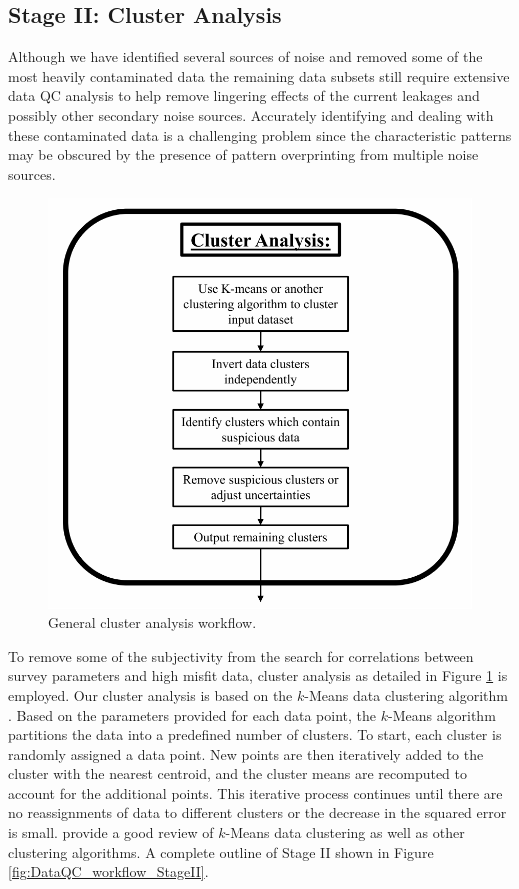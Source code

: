 \documentclass[final,authoryear,5p,times,twocolumn]{elsarticle}
\begin{document}
\subsection{Stage II: Cluster Analysis}
\label{Data_Quality_Control:StageII_Cluster_Analysis}

Although we have identified several sources of noise and removed some of the most heavily contaminated data the remaining data subsets still require extensive data QC analysis to help remove lingering effects of the current leakages and possibly other secondary noise sources. Accurately identifying and dealing with these contaminated data is a challenging problem since the characteristic patterns may be obscured by the presence of pattern overprinting from multiple noise sources. 

\begin{figure} [!ht]
\begin{center}
   \includegraphics[trim=0cm 0cm 0cm 0cm, clip=true,width=0.75\linewidth]{./Figures/Fig10.pdf}    
\end{center}
\caption{General cluster analysis workflow.}
\label{fig:DataQC_workflow_ClusterAnalysis}
\end{figure}

To remove some of the subjectivity from the search for correlations between survey parameters and high misfit data, cluster analysis as detailed in Figure \ref{fig:DataQC_workflow_ClusterAnalysis} is employed. Our cluster analysis is based on the $k$-Means data clustering algorithm \citep{MacQueen1967}. Based on the parameters provided for each data point, the $k$-Means algorithm partitions the data into a predefined number of clusters. To start, each cluster is randomly assigned a data point. New points are then iteratively added to the cluster with the nearest centroid, and the cluster means are recomputed to account for the additional points. This iterative process continues until there are no reassignments of data to different clusters or the decrease in the squared error is small. \cite{Jain1999} provide a good review of $k$-Means data clustering as well as other clustering algorithms. A complete outline of Stage II shown in Figure \ref{fig:DataQC_workflow_StageII}.
\end{document}
